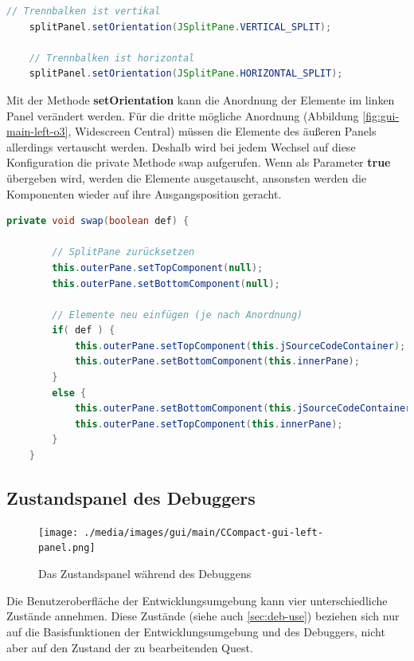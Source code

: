 \begin{lstlisting}[language=JAVA]
	// Trennbalken ist vertikal
	splitPanel.setOrientation(JSplitPane.VERTICAL_SPLIT);
	
	// Trennbalken ist horizontal
	splitPanel.setOrientation(JSplitPane.HORIZONTAL_SPLIT);
\end{lstlisting}

Mit der Methode \textbf{setOrientation} kann die Anordnung der Elemente im linken Panel verändert werden. Für die dritte mögliche Anordnung (Abbildung \ref{fig:gui-main-left-o3}, \glqq{}Widescreen Central\grqq{}) müssen die Elemente des äußeren Panels allerdings vertauscht werden. Deshalb wird bei jedem Wechsel auf diese Konfiguration die private Methode \glqq{}swap\grqq{} aufgerufen. Wenn als Parameter \textbf{true} übergeben wird, werden die Elemente ausgetauscht, ansonsten werden die Komponenten wieder auf ihre Ausgangsposition geracht.

\begin{lstlisting}[language=JAVA]
	private void swap(boolean def) {
		
		// SplitPane zurücksetzen
		this.outerPane.setTopComponent(null);
		this.outerPane.setBottomComponent(null);
		
		// Elemente neu einfügen (je nach Anordnung)
		if( def ) {
			this.outerPane.setTopComponent(this.jSourceCodeContainer);
			this.outerPane.setBottomComponent(this.innerPane);
		}
		else {
			this.outerPane.setBottomComponent(this.jSourceCodeContainer);
			this.outerPane.setTopComponent(this.innerPane);
		}
	}
\end{lstlisting}

\subsection{Zustandspanel des Debuggers}
\label{sec:gui-main-left-zust}

\begin{figure}[htbp] 
  \centering
     \texttt{[image: ./media/images/gui/main/CCompact-gui-left-panel.png]}
  \caption{Das Zustandspanel während des Debuggens}
  \label{fig:gui-main-left-panel}
\end{figure}

Die Benutzeroberfläche der Entwicklungsumgebung kann vier unterschiedliche Zustände annehmen. Diese Zustände (siehe auch \ref{sec:deb-use}) beziehen sich nur auf die Basisfunktionen der Entwicklungsumgebung und des Debuggers, nicht aber auf den Zustand der zu bearbeitenden Quest.

